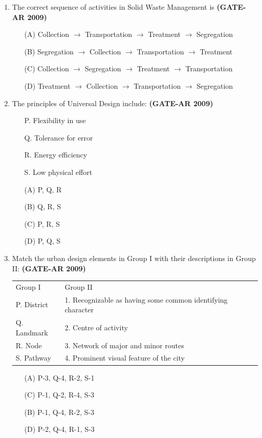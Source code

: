 \documentclass[a4paper,10pt]{article}
\begin{document}
\begin{enumerate}
	\item The correct sequence of activities in Solid Waste Management is \hfill \textbf{(GATE-AR 2009)}
    \begin{itemize}
        \item[(A)] Collection $\to$ Transportation $\to$ Treatment $\to$ Segregation
        \item[(B)] Segregation $\to$ Collection $\to$ Transportation $\to$ Treatment
        \item[(C)] Collection $\to$ Segregation $\to$ Treatment $\to$ Transportation
        \item[(D)] Treatment $\to$ Collection $\to$ Transportation $\to$ Segregation
    \end{itemize}
    
    \item The principles of Universal Design include: \hfill \textbf{(GATE-AR 2009)}
    \begin{itemize}
        \item[P.] Flexibility in use
        \item[Q.] Tolerance for error
        \item[R.] Energy efficiency
        \item[S.] Low physical effort
    \end{itemize}
    \begin{multicols}{4}
	\begin{itemize}
        \item[(A)] P, Q, R
        \item[(B)] Q, R, S
        \item[(C)] P, R, S
        \item[(D)] P, Q, S
    \end{itemize}
	\end{multicols}
    
    \item Match the urban design elements in Group I with their descriptions in Group II: \hfill \textbf{(GATE-AR 2009)} \\
    \begin{tabular}{ p p }
	Group I & Group II \\
	P. District & 1. Recognizable as having some common identifying character \\
	Q. Landmark & 2. Centre of activity \\
	R. Node & 3. Network of major and minor routes \\
	S. Pathway & 4. Prominent visual feature of the city \\
	\end{tabular}
	\begin{multicols}{2}
	\begin{itemize}
        \item[(A)] P-3, Q-4, R-2, S-1
        \item[(C)] P-1, Q-2, R-4, S-3
        \item[(B)] P-1, Q-4, R-2, S-3
        \item[(D)] P-2, Q-4, R-1, S-3
    \end{itemize}
	\end{multicols}


\end{enumerate}
\end{document}

